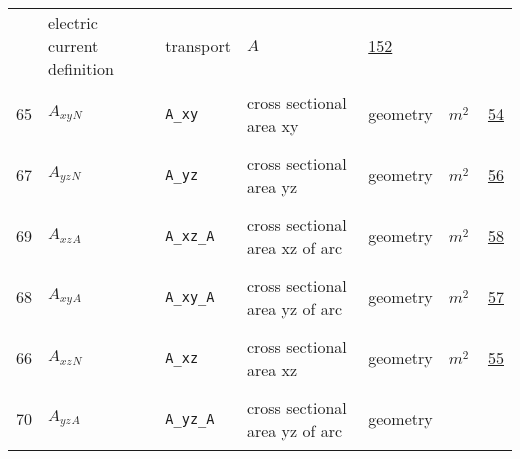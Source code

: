 \begin{longtable}{|p{1cm}|p{2.5cm}|p{4.5cm}|p{8cm}|p{3.0cm}|p{3cm}|p{1cm}|}
             & electric current definition
             & \begin{lay}transport \end{lay}
             & $ A \, $
             &                 \hyperlink{"e:152"}{ 152 }
                 \\
            65
             & \hypertarget{"v:65"}{ $ {{A_{xy}}}{_{N}} $}
             & \verb|A_xy|
             & cross sectional area xy
             & \begin{lay}geometry \end{lay}
             & $ m^{2} \, $
             &                 \hyperlink{"e:54"}{ 54 }
                 \\
            67
             & \hypertarget{"v:67"}{ $ {{A_{yz}}}{_{N}} $}
             & \verb|A_yz|
             & cross sectional area yz
             & \begin{lay}geometry \end{lay}
             & $ m^{2} \, $
             &                 \hyperlink{"e:56"}{ 56 }
                 \\
            69
             & \hypertarget{"v:69"}{ $ {{A_{xz}}}{_{A}} $}
             & \verb|A_xz_A|
             & cross sectional area xz of arc
             & \begin{lay}geometry \end{lay}
             & $ m^{2} \, $
             &                 \hyperlink{"e:58"}{ 58 }
                 \\
            68
             & \hypertarget{"v:68"}{ $ {{A_{xy}}}{_{A}} $}
             & \verb|A_xy_A|
             & cross sectional area yz of arc
             & \begin{lay}geometry \end{lay}
             & $ m^{2} \, $
             &                 \hyperlink{"e:57"}{ 57 }
                 \\
            66
             & \hypertarget{"v:66"}{ $ {{A_{xz}}}{_{N}} $}
             & \verb|A_xz|
             & cross sectional area xz
             & \begin{lay}geometry \end{lay}
             & $ m^{2} \, $
             &                 \hyperlink{"e:55"}{ 55 }
                 \\
            70
             & \hypertarget{"v:70"}{ $ {{A_{yz}}}{_{A}} $}
             & \verb|A_yz_A|
             & cross sectional area yz of arc
             & \begin{lay}geometry \end{lay}

\end{longtable}
